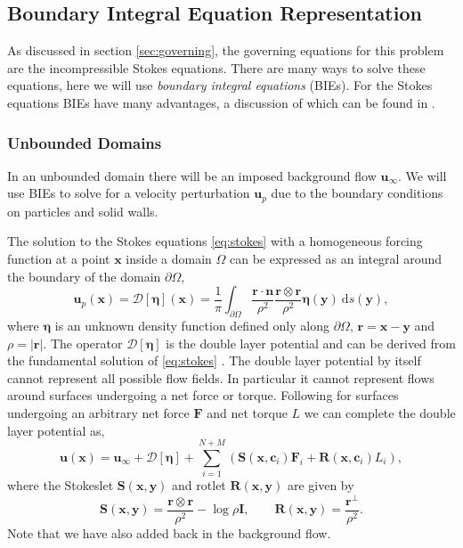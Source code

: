 \documentclass[preprint, 10pt]{elsarticle}
\begin{document}
\subsection{Boundary Integral Equation Representation}

As discussed in section \ref{sec:governing}, the governing equations for this problem are the incompressible Stokes equations. There are many ways to solve these equations, here we will use \textit{boundary integral equations} (BIEs). For the Stokes equations BIEs have many advantages, a discussion of which can be found in \cite{Karrila1989}. 

\subsubsection{Unbounded Domains}

In an unbounded domain there will be an imposed background flow $\mathbf{u}_{\infty}$. We will use BIEs to solve for a velocity perturbation $\mathbf{u}_p$ due to the boundary conditions on particles and solid walls.

The solution to the Stokes equations \eqref{eq:stokes} with a homogeneous forcing function at a point $\mathbf{x}$ inside a domain $\Omega$ can be expressed as an integral around the boundary of the domain $\partial\Omega$,
\begin{equation}\label{eq:dlp}\mathbf{u}_p(\mathbf{x}) = \mathcal{D}[\pmb{\eta}](\mathbf{x}) = \frac{1}{\pi}\int_{\partial\Omega} \frac{\mathbf{r}\cdot\mathbf{n}}{\rho^2}\frac{\mathbf{r}\otimes\mathbf{r}}{\rho^2}\pmb{\eta}(\mathbf{y})~\text{d}s(\mathbf{y}),\end{equation}
where $\pmb{\eta}$ is an unknown density function defined only along $\partial\Omega$, $\mathbf{r}=\mathbf{x}-\mathbf{y}$ and $\rho=|\mathbf{r}|$. The operator $\mathcal{D}[\pmb{\eta}]$ is the double layer potential and can be derived from the fundamental solution of \eqref{eq:stokes} \cite{Ladyzhenskaya1963, Pozrikidis1992}. The double layer potential by itself cannot represent all possible flow fields. In particular it cannot represent flows around surfaces undergoing a net force or torque. Following \cite{Power1987, Power1993} for surfaces undergoing an arbitrary net force $\mathbf{F}$ and net torque $L$ we can complete the double layer potential as,
\[ \mathbf{u}(\mathbf{x}) = \mathbf{u}_{\infty} +  \mathcal{D}[\pmb{\eta}] + \sum\limits_{i=1}^{N+M} \left(\mathbf{S}(\mathbf{x},\mathbf{c}_i)\mathbf{F}_i + \mathbf{R}(\mathbf{x},\mathbf{c}_i)L_i\right),\]
where the Stokeslet $\mathbf{S}(\mathbf{x},\mathbf{y})$ and rotlet $\mathbf{R}(\mathbf{x},\mathbf{y})$ are given by
\[ \mathbf{S}(\mathbf{x},\mathbf{y}) = \frac{\mathbf{r}\otimes\mathbf{r}}{\rho^2} - \log\rho\mathbf{I},\qquad \mathbf{R}(\mathbf{x},\mathbf{y}) = \frac{\mathbf{r}^\perp}{\rho^2}.\]
Note that we have also added back in the background flow.
\end{document}

